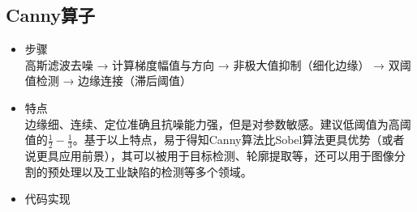\documentclass[11pt]{article}
\begin{document}
      \subsection*{Canny算子}
  \begin{itemize}
  	\item 步骤\\
  	高斯滤波去噪 → 计算梯度幅值与方向 → 非极大值抑制（细化边缘） → 双阈值检测 → 边缘连接（滞后阈值）
  	\item 特点\\
  	边缘细、连续、定位准确且抗噪能力强，但是对参数敏感。建议低阈值为高阈值的$\frac{1}{2}-\frac{1}{3}$。基于以上特点，易于得知Canny算法比Sobel算法更具优势（或者说更具应用前景），其可以被用于目标检测、轮廓提取等，还可以用于图像分割的预处理以及工业缺陷的检测等多个领域。
  	\item 代码实现
  	\begin{center}
  	\end{center}
  \end{itemize}
\end{document}
